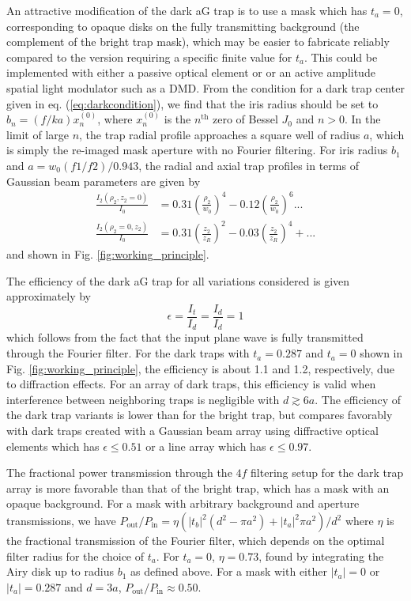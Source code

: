 An attractive modification of the dark aG trap is to use a mask which has $t_a=0$, corresponding to opaque disks on the fully transmitting background (the complement of the bright trap mask), which may be easier to fabricate reliably compared to the version requiring a specific finite value for $t_a$. This could be implemented with either a passive optical element or or an active amplitude spatial light modulator such as a DMD. From the condition for a dark trap center given in eq. (\ref{eq:darkcondition}), we find that the iris radius should be set to $b_n=(f/ka)x_n^{(0)}$, where $x_n^{(0)}$ is the $n^{\text {th}}$ zero of Bessel $J_0$ and $n>0$. In the limit of large $n$, the trap radial profile   approaches a square well of radius $a$, which is simply the re-imaged mask aperture with no Fourier filtering. For iris radius $b_1$ and $a=w_0(f1/f2)/0.943$, the radial and axial trap profiles in terms of Gaussian beam parameters are given by
\begin{equation} \label{eq:Iag_dark3}
    \begin{aligned}
    \frac{I_2(\rho_2,z_2=0)}{I_0} &= 0.31 \left(\frac{\rho_2}{w_0}\right)^4 - 0.12 \left(\frac{\rho_2}{w_0}\right)^6... \\
    \frac{I_2(\rho_2=0,z_2)}{I_0} &= 0.31 \left(\frac{z_2}{z_R}\right)^2 - 0.03 \left(\frac{z_2}{z_R}\right)^4 + ...
    \end{aligned}
\end{equation}
and  shown in Fig. \ref{fig:working_principle}. 

The efficiency of the dark aG trap for all variations considered is given approximately by
\begin{equation}
\epsilon=\frac{I_{t}}{I_{d}}=\frac{I_{d}}{I_{d}}=1
\end{equation}
which follows from the fact that the input plane wave is fully transmitted through the Fourier filter. For the dark traps with $t_a=0.287$ and $t_a=0$ shown in Fig. \ref{fig:working_principle}, the efficiency is about 1.1 and 1.2, respectively, due to diffraction effects. For an array of dark traps, this efficiency is valid when interference between neighboring traps is negligible with $d\gtrsim6a$. The efficiency of the dark trap variants is lower than for the bright trap, but compares favorably with dark traps created with a Gaussian beam array using diffractive optical elements which has $\epsilon \leq 0.51$ \cite{Piotrowicz2013} or a line array which
has $\epsilon \leq 0.97$\cite{Saffmanlines}.

The fractional power transmission through the $4f$ filtering setup for the dark trap array is more favorable than that of the bright trap, which has a mask with an opaque background. For a mask with arbitrary background and aperture transmissions, we have $P_{\text {out}}/P_{\text {in}} = \eta(|t_b|^2(d^2 - \pi a^2) + |t_a|^2 \pi a^2)/d^2$ where $\eta$ is the fractional transmission of the Fourier filter, which depends on the optimal filter radius for the choice of $t_a$. For $t_a=0$,  $\eta=0.73$, found by integrating the Airy disk up to radius $b_1$ as defined above. For a mask with either $|t_a|=0$ or  $|t_a|=0.287$ and $d=3a$, $P_{\text {out}}/P_{\text {in}}\approx 0.50$.

